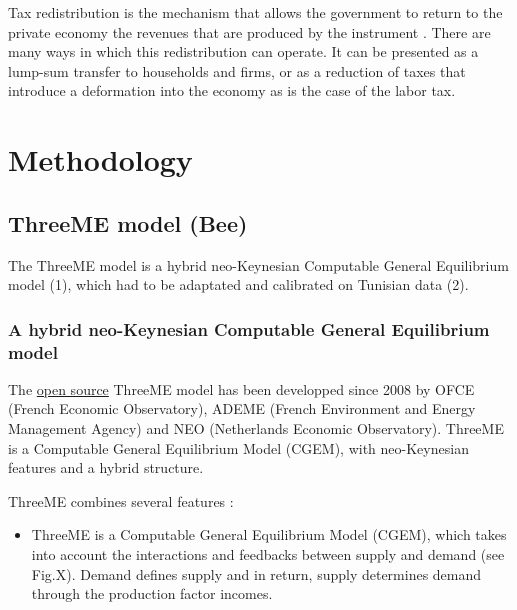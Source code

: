 \documentclass[
]{article}
\providecommand{\tightlist}{%
  \setlength{\itemsep}{0pt}\setlength{\parskip}{0pt}}
\begin{document}
Tax redistribution is the mechanism that allows the government to return
to the private economy the revenues that are produced by the instrument
\autocite{goulder}. There are many ways in which this redistribution can
operate. It can be presented as a lump-sum transfer to households and
firms, or as a reduction of taxes that introduce a deformation into the
economy as is the case of the labor tax.

\hypertarget{methodology}{%
\section{Methodology}\label{methodology}}

\hypertarget{threeme-model-bee}{%
\subsection{ThreeME model (Bee)}\label{threeme-model-bee}}

The ThreeME model is a hybrid neo-Keynesian Computable General
Equilibrium model (1), which had to be adaptated and calibrated on
Tunisian data (2).

\hypertarget{a-hybrid-neo-keynesian-computable-general-equilibrium-model}{%
\subsubsection{A hybrid neo-Keynesian Computable General Equilibrium
model}\label{a-hybrid-neo-keynesian-computable-general-equilibrium-model}}

The \href{https://github.com/fosem/ThreeME_V3-open}{open source} ThreeME
model has been developped since 2008 by OFCE (French Economic
Observatory), ADEME (French Environment and Energy Management Agency)
and NEO (Netherlands Economic Observatory). ThreeME is a Computable
General Equilibrium Model (CGEM), with neo-Keynesian features and a
hybrid structure.

ThreeME combines several features \autocites[
]{callonnec2013}{callonnec2021} :

\begin{itemize}
\tightlist
\item
  ThreeME is a Computable General Equilibrium Model (CGEM), which takes
  into account the interactions and feedbacks between supply and demand
  (see Fig.X). Demand defines supply and in return, supply determines
  demand through the production factor incomes.
\end{itemize}
\end{document}
